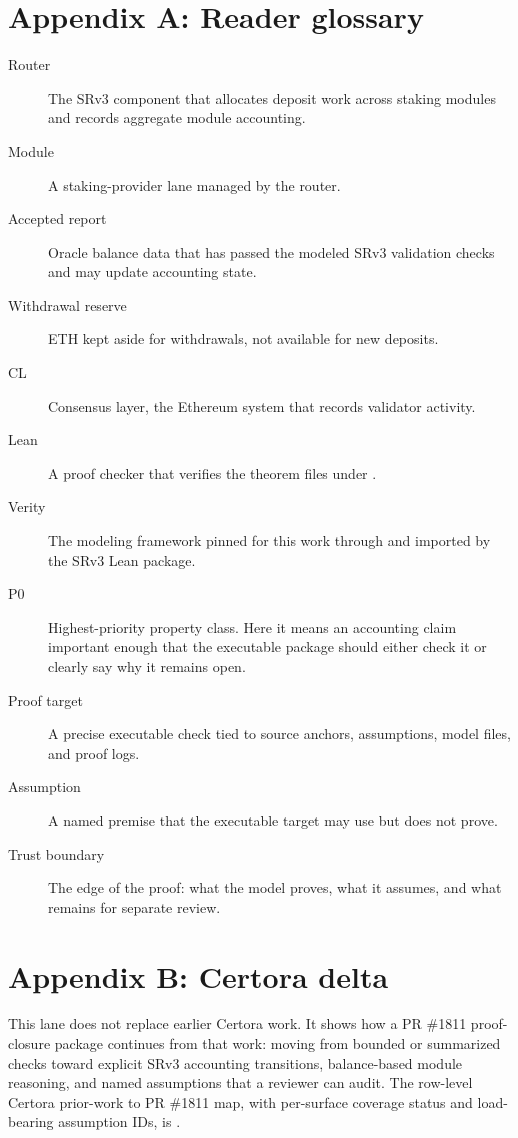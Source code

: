 \section{Appendix A: Reader glossary}
\label{app:glossary}

\begin{description}
  \item[Router] The SRv3 component that allocates deposit work across staking
  modules and records aggregate module accounting.
  \item[Module] A staking-provider lane managed by the router.
  \item[Accepted report] Oracle balance data that has passed the modeled SRv3
  validation checks and may update accounting state.
  \item[Withdrawal reserve] ETH kept aside for withdrawals, not available for
  new deposits.
  \item[CL] Consensus layer, the Ethereum system that records validator
  activity.
  \item[Lean] A proof checker that verifies the theorem files under
  .
  \item[Verity] The modeling framework pinned for this work through
   and imported by the SRv3 Lean package.
  \item[P0] Highest-priority property class. Here it means an accounting claim
  important enough that the executable package should either check it or clearly
  say why it remains open.
  \item[Proof target] A precise executable check tied to source anchors,
  assumptions, model files, and proof logs.
  \item[Assumption] A named premise that the executable target may use but does
  not prove.
  \item[Trust boundary] The edge of the proof: what the model proves, what it
  assumes, and what remains for separate review.
\end{description}

\section{Appendix B: Certora delta}
\label{app:certora-map}

\noindent This lane does not replace earlier Certora work. It shows how a
PR \#1811 proof-closure package continues from that work: moving from bounded or
summarized checks toward explicit SRv3 accounting transitions, balance-based
module reasoning, and named assumptions that a reviewer can audit. The
row-level Certora prior-work to PR \#1811 map, with per-surface coverage status
and load-bearing assumption IDs, is
.

